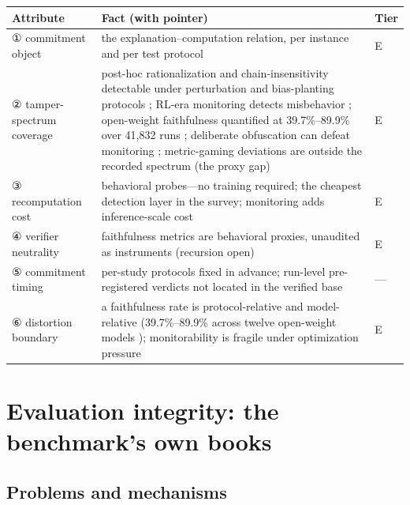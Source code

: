 \documentclass[11pt,a4paper]{article}
\begin{document}
\begin{table}[htbp]
\centering
\footnotesize
\setlength{\tabcolsep}{3.5pt}
\renewcommand{\arraystretch}{1.18}
\begin{tabularx}{0.985\textwidth}{>{\raggedright\arraybackslash}p{} >{\raggedright\arraybackslash}X >{\raggedright\arraybackslash}p{}}
\toprule
\textbf{Attribute} & \textbf{Fact (with pointer)} & \textbf{Tier} \\
\midrule
① commitment object & the explanation–computation relation, per instance and per test protocol \cite{key02,key03} & E \\
② tamper-spectrum coverage & post-hoc rationalization and chain-insensitivity detectable under perturbation and bias-planting protocols \cite{key02,key03}; RL-era monitoring detects misbehavior \cite{key30,key31}; open-weight faithfulness quantified at 39.7\%–89.9\% over 41,832 runs \cite{key32}; deliberate obfuscation can defeat monitoring \cite{key34}; metric-gaming deviations are outside the recorded spectrum (the proxy gap) & E \\
③ recomputation cost & behavioral probes—no training required; the cheapest detection layer in the survey; monitoring adds inference-scale cost \cite{key30} & E \\
④ verifier neutrality & faithfulness metrics are behavioral proxies, unaudited as instruments (recursion open) \cite{key02,key03} & E \\
⑤ commitment timing & per-study protocols fixed in advance; run-level pre-registered verdicts not located in the verified base & — \\
⑥ distortion boundary & a faithfulness rate is protocol-relative and model-relative (39.7\%–89.9\% across twelve open-weight models \cite{key32}); monitorability is fragile under optimization pressure \cite{key30,key32,key33,key34} & E \\
\bottomrule
\end{tabularx}
\end{table}

\section{Evaluation integrity: the benchmark's own books}

\subsection{Problems and mechanisms}
\end{document}

